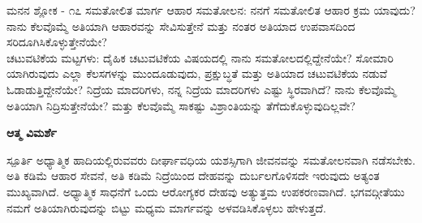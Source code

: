 \newpage
\begin{mananam}{\mananamfont \large{ಮನನ ಶ್ಲೋಕ - ೧೭}}
\mananamtext ಸಮತೋಲಿತ ಮಾರ್ಗ ಆಹಾರ ಸಮತೋಲನ:
ನನಗೆ ಸಮತೋಲಿತ ಆಹಾರ ಕ್ರಮ ಯಾವುದು? ನಾನು ಕೆಲವೊಮ್ಮೆ ಅತಿಯಾಗಿ ಆಹಾರವನ್ನು ಸೇವಿಸುತ್ತೇನೆ ಮತ್ತು ನಂತರ ಅತಿಯಾದ ಉಪವಾಸದಿಂದ ಸರಿದೂಗಿಸಿಕೊಳ್ಳುತ್ತೇನೆಯೇ?\\
ಚಟುವಟಿಕೆಯ ಮಟ್ಟಗಳು: ದೈಹಿಕ ಚಟುವಟಿಕೆಯ ವಿಷಯದಲ್ಲಿ ನಾನು  ಸಮತೋಲದಲ್ಲಿದ್ದೇನೆಯೇ? ಸೋಮಾರಿ ಯಾಗಿರುವುದು ಎಲ್ಲಾ ಕೆಲಸಗಳನ್ನು ಮುಂದೂಡುವುದು,  ಪ್ರಕ್ಷುಬ್ಧತೆ ಮತ್ತು ಅತಿಯಾದ ಚಟುವಟಿಕೆಯ ನಡುವೆ ಓಡಾಡುತ್ತಿದ್ದೇನೆಯೇ? ನಿದ್ರೆಯ ಮಾದರಿಗಳು,
ನನ್ನ ನಿದ್ರೆಯ ಮಾದರಿಗಳು ಎಷ್ಟು ಸ್ಥಿರವಾಗಿದೆ? ನಾನು ಕೆಲವೊಮ್ಮೆ ಅತಿಯಾಗಿ ನಿದ್ರಿಸುತ್ತೇನೆಯೇ? ಮತ್ತು ಕೆಲವೊಮ್ಮೆ ಸಾಕಷ್ಟು ವಿಶ್ರಾಂತಿಯನ್ನು ತೆಗೆದುಕೊಳ್ಳುವುದಿಲ್ಲವೇ?
\end{mananam}
\WritingHand\enspace\textbf{ಆತ್ಮ ವಿಮರ್ಶೆ}\\
\begin{inspiration}{\mananamfont \large ಸ್ಪೂರ್ತಿ}
\mananamtext ಅಧ್ಯಾತ್ಮಿಕ ಹಾದಿಯಲ್ಲಿರುವವರು ದೀರ್ಘಾವಧಿಯ ಯಶಸ್ಸಿಗಾಗಿ ಜೀವನವನ್ನು  ಸಮತೋಲನವಾಗಿ ನಡೆಸಬೇಕು. ಅತಿ ಕಡಿಮೆ ಆಹಾರ ಸೇವನೆ, ಅತಿ ಕಡಿಮೆ  ನಿದ್ರೆಯಿಂದ ದೇಹವನ್ನು ದುರ್ಬಲಗೊಳಿಸದೇ ಇರುವುದು ಅತ್ಯಂತ ಮುಖ್ಯವಾಗಿದೆ. ಅಧ್ಯಾತ್ಮಿಕ ಸಾಧನೆಗೆ ಒಂದು ಆರೋಗ್ಯಕರ ದೇಹವು ಅತ್ಯುತ್ತಮ ಉಪಕರಣವಾಗಿದೆ. ಭಗವದ್ಗೀತೆಯು ನಮಗೆ ಅತಿಯಾಗಿರುವುದನ್ನು ಬಿಟ್ಟು ಮಧ್ಯಮ ಮಾರ್ಗವನ್ನು ಅಳವಡಿಸಿಕೊಳ್ಳಲು ಹೇಳುತ್ತದೆ.
\end{inspiration}
\newpage

